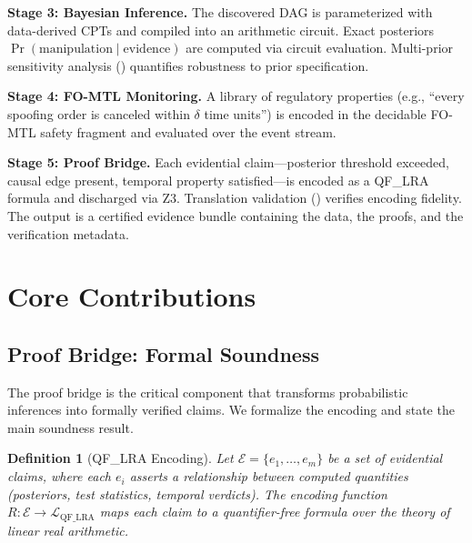 \documentclass[11pt]{article}
\newtheorem{definition}[theorem]{Definition}
\DeclareMathOperator{\Pr}{Pr}
\begin{document}
\textbf{Stage 3: Bayesian Inference.}
The discovered DAG is parameterized with data-derived CPTs and compiled into an arithmetic circuit.
Exact posteriors $\Pr(\text{manipulation} \mid \text{evidence})$ are computed via circuit evaluation.
Multi-prior sensitivity analysis () quantifies robustness to prior specification.

\textbf{Stage 4: FO-MTL Monitoring.}
A library of regulatory properties (e.g., ``every spoofing order is canceled within $\delta$ time units'') is encoded in the decidable FO-MTL safety fragment and evaluated over the event stream.

\textbf{Stage 5: Proof Bridge.}
Each evidential claim---posterior threshold exceeded, causal edge present, temporal property satisfied---is encoded as a QF\_LRA formula and discharged via Z3.
Translation validation () verifies encoding fidelity.
The output is a certified evidence bundle containing the data, the proofs, and the verification metadata.

\section{Core Contributions}
\label{sec:contributions}

\subsection{Proof Bridge: Formal Soundness}
\label{sec:proof-bridge}

The proof bridge is the critical component that transforms probabilistic inferences into formally verified claims.
We formalize the encoding and state the main soundness result.

\begin{definition}[QF\_LRA Encoding]
\label{def:encoding}
Let $\mathcal{E} = \{e_1, \ldots, e_m\}$ be a set of evidential claims, where each $e_i$ asserts a relationship between computed quantities (posteriors, test statistics, temporal verdicts).
The encoding function $R: \mathcal{E} \to \mathcal{L}_{\text{QF\_LRA}}$ maps each claim to a quantifier-free formula over the theory of linear real arithmetic.
\end{definition}
\end{document}
